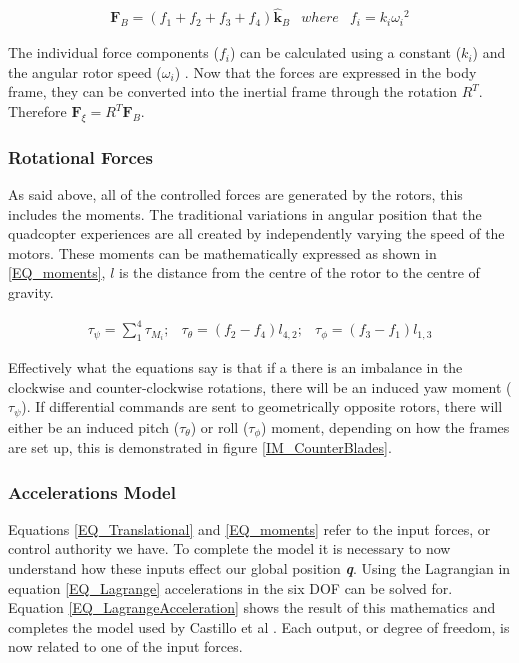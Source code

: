 \begin{eqnarray}
\textbf{F}_B = (f_1 + f_2 + f_3 + f_4)\hat{\textbf{k}}_B & where & f_i = k_i {\omega_i}^2
\label{EQ_Translational}
\end{eqnarray}

The individual force components ($f_i$) can be calculated using a constant ($k_i$) and the angular rotor speed ($\omega_i$) \cite{RealTime}. Now that the forces are expressed in the body frame, they can be converted into the inertial frame through the rotation $R^T$. Therefore $\textbf{F}_\xi = R^T \textbf{F}_B$.

\subsubsection{Rotational Forces}
As said above, all of the controlled forces are generated by the rotors, this includes the moments. The traditional variations in angular position that the quadcopter experiences are all created by independently varying the speed of the motors. These moments can be mathematically expressed as shown in \ref{EQ_moments}, $l$ is the distance from the centre of the rotor to the centre of gravity. \cite{Modelling}

\begin{eqnarray}
\tau_\psi = \sum_{1}^{4} \tau_{M_i};&
\tau_\theta = (f_2 - f_4)l_{4,2};&
\tau_\phi = (f_3 - f_1)l_{1,3}
\label{EQ_moments}
\end{eqnarray}

Effectively what the equations say is that if a there is an imbalance in the clockwise and counter-clockwise rotations, there will be an induced yaw moment ($\tau_\psi$). If differential commands are sent to geometrically opposite rotors, there will either be an induced pitch ($\tau_\theta$) or roll ($\tau_\phi$) moment, depending on how the frames are set up, this is demonstrated in figure \ref{IM_CounterBlades}.

\subsubsection{Accelerations Model}
Equations \ref{EQ_Translational} and \ref{EQ_moments} refer to the input forces, or control authority we have. To complete the model it is necessary to now understand how these inputs effect our global position \textbf{\textit{q}}. Using the Lagrangian in equation \ref{EQ_Lagrange} accelerations in the six DOF  can be solved for. Equation \ref{EQ_LagrangeAcceleration} shows the result of this mathematics and completes the model used by Castillo et al \cite{MiniFlying, RealTime}. Each output, or degree of freedom, is now related to one of the input forces.

